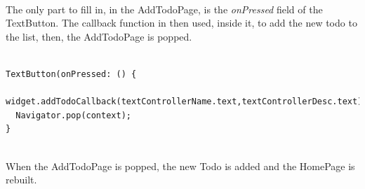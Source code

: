 \mbox{}\\
The only part to fill in, in the AddTodoPage, is the \textit{onPressed} field of the TextButton. The callback function in then used, inside it, to add the new todo to the list, then, the AddTodoPage is popped.
\mbox{}\\
\mbox{}
\begin{code}
\label{code:2.36}
\begin{verbatim}

TextButton(onPressed: () {
  widget.addTodoCallback(textControllerName.text,textControllerDesc.text);
  Navigator.pop(context);
}
\end{verbatim}
\end{code}
\mbox{}\\
When the AddTodoPage is popped, the new Todo is added and the HomePage is rebuilt.\\


